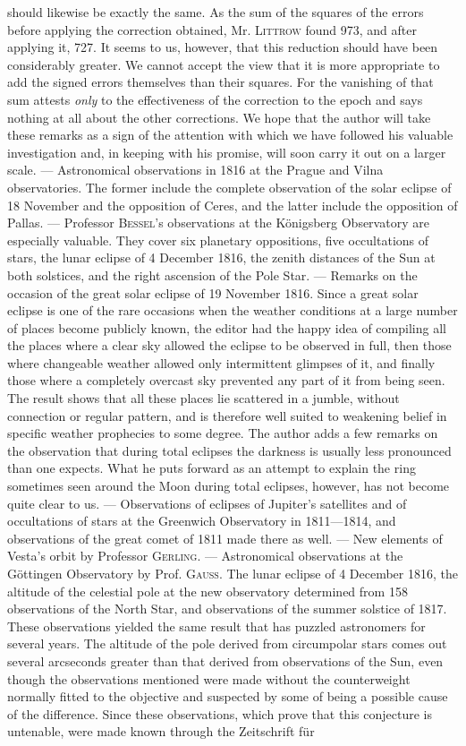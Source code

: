 should likewise be exactly the same. As the sum of the squares of the errors before applying the correction obtained, Mr. \textsc{Littrow} found 973, and after applying it, 727. It seems to us, however, that this reduction should have been considerably greater. We cannot accept the view that it is more appropriate to add the signed errors themselves than their squares. For the vanishing of that sum attests \emph{only} to the effectiveness of the correction to the epoch and says nothing at all about the other corrections. We hope that the author will take these remarks as a sign of the attention with which we have followed his valuable investigation and, in keeping with his promise, will soon carry it out on a larger scale. --- Astronomical observations in 1816 at the Prague and Vilna observatories. The former include the complete observation of the solar eclipse of 18 November and the opposition of Ceres, and the latter include the opposition of Pallas. --- Professor \textsc{Bessel}'s observations at the Königsberg Observatory are especially valuable. They cover six planetary oppositions, five occultations of stars, the lunar eclipse of 4 December 1816, the zenith distances of the Sun at both solstices, and the right ascension of the Pole Star. --- Remarks on the occasion of the great solar eclipse of 19 November 1816. Since a great solar eclipse is one of the rare occasions when the weather conditions at a large number of places become publicly known, the editor had the happy idea of compiling all the places where a clear sky allowed the eclipse to be observed in full, then those where changeable weather allowed only intermittent glimpses of it, and finally those where a completely overcast sky prevented any part of it from being seen. The result shows that all these places lie scattered in a jumble, without connection or regular pattern, and is therefore well suited to weakening belief in specific weather prophecies to some degree. The author adds a few remarks on the observation that during total eclipses the darkness is usually less pronounced than one expects. What he puts forward as an attempt to explain the ring sometimes seen around the Moon during total eclipses, however, has not become quite clear to us. --- Observations of eclipses of Jupiter's satellites and of occultations of stars at the Greenwich Observatory in 1811---1814, and observations of the great comet of 1811 made there as well. --- New elements of Vesta's orbit by Professor \textsc{Gerling}. --- Astronomical observations at the Göttingen Observatory by Prof. \textsc{Gauss}. The lunar eclipse of 4 December 1816, the altitude of the celestial pole at the new observatory determined from 158 observations of the North Star, and observations of the summer solstice of 1817. These observations yielded the same result that has puzzled astronomers for several years. The altitude of the pole derived from circumpolar stars comes out several arcseconds greater than that derived from observations of the Sun, even though the observations mentioned were made without the counterweight normally fitted to the objective and suspected by some of being a possible cause of the difference. Since these observations, which prove that this conjecture is untenable, were made known through the Zeitschrift für 
